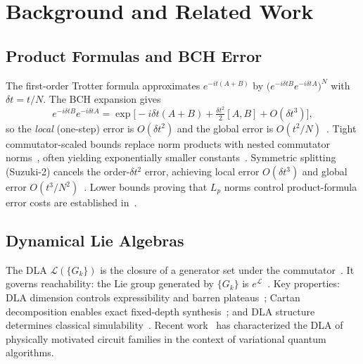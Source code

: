 \documentclass[aps,prxquantum,twocolumn,nofootinbib]{revtex4-2}
\begin{document}
\section{Background and Related Work}
\label{sec:background}

\subsection{Product Formulas and BCH Error}

The first-order Trotter formula approximates $e^{-it(A+B)}$ by
$\bigl(e^{-i\delta t B}e^{-i\delta t A}\bigr)^N$ with
$\delta t = t/N$. The BCH expansion gives
\begin{equation}
  e^{-i\delta t B}e^{-i\delta t A}
  = \exp\!\bigl[
      -i\delta t(A+B)
      + \tfrac{\delta t^2}{2}[A,B]
      + O(\delta t^3)
    \bigr],
  \label{eq:bch-expand}
\end{equation}
so the \emph{local} (one-step) error is $O(\delta t^2)$ and the
global error is $O(t^2/N)$~\cite{suzuki1990,lloyd1996}.
Tight commutator-scaled bounds replace norm products with nested
commutator norms~\cite{childs2021,zhuk2023,haah2021,layden2022},
often yielding exponentially smaller
constants~\cite{campbell2022,liu2023prl,park2024prl}.
Symmetric splitting (Suzuki-2) cancels the order-$\delta t^2$ error,
achieving local error $O(\delta t^3)$ and global error
$O(t^3/N^2)$~\cite{suzuki1990}. Lower bounds proving that
$L_p$ norms control product-formula error costs are established
in~\cite{low2023pra,berry2015prl,childs2022}.

\subsection{Dynamical Lie Algebras}

The DLA $\mathcal{L}(\{G_k\})$ is the closure of a generator set
under the commutator~\cite{gibbs2024,goh2023}. It governs
reachability: the Lie group generated by $\{G_k\}$ is
$e^{\mathcal{L}}$~\cite{larocca2022,larocca2023}.
Key properties:
DLA dimension controls expressibility and barren
plateaus~\cite{ragone2023,larocca2023,goh2024hams};
Cartan decomposition enables exact fixed-depth
synthesis~\cite{kokcu2022,steckmann2023};
and DLA structure determines classical
simulability~\cite{goh2023,fontana2023,luo2022}.
Recent work~\cite{cerezo2024pra,sauvage2024pra,wu2023}
has characterized the DLA of physically motivated circuit families
in the context of variational quantum algorithms.
\end{document}
